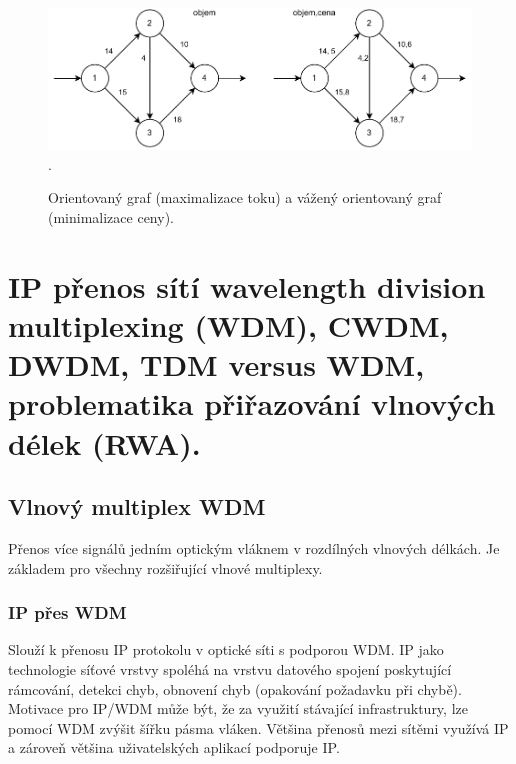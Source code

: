 \begin{figure}[ht]
    \centering
    \includegraphics[width=\textwidth]{snimky/ilp}.
    \caption{Orientovaný graf (maximalizace toku) a vážený orientovaný graf (minimalizace ceny).}
\end{figure}


\clearpage
\section{IP přenos sítí wavelength division multiplexing (WDM), CWDM, DWDM, TDM versus WDM, problematika přiřazování vlnových délek (RWA).}

\subsection{Vlnový multiplex WDM}

Přenos více signálů jedním optickým vláknem v rozdílných vlnových délkách. Je základem pro všechny rozšiřující vlnové multiplexy.

\subsubsection{IP přes WDM}

Slouží k přenosu IP protokolu v optické síti s podporou WDM. IP jako technologie síťové vrstvy spoléhá na vrstvu datového spojení poskytující rámcování, detekci chyb, obnovení chyb (opakování požadavku při chybě). Motivace pro IP/WDM může být, že za využití stávající infrastruktury, lze pomocí WDM zvýšit šířku pásma vláken. Většina přenosů mezi sítěmi využívá IP a zároveň většina uživatelských aplikací podporuje IP.

